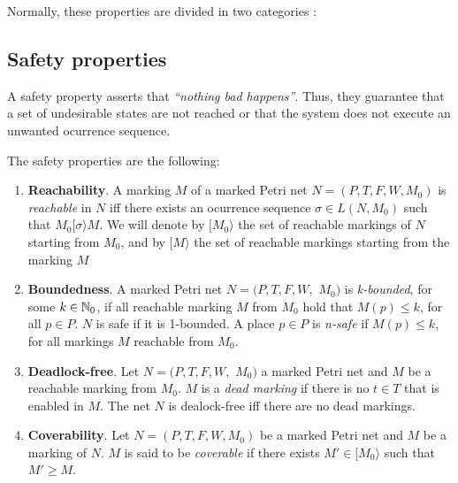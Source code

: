 \medskip
Normally, these properties are divided in two categories \cite{citar}:

\subsection{Safety properties}
A safety property asserts that \emph{``nothing bad happens''}.
Thus, they guarantee that a set of undesirable states are not reached or that
the system does not execute an unwanted ocurrence sequence.

The safety properties are the following:

\begin{enumerate}
\item {\bf Reachability}. A marking $M$ of a marked Petri net
$N= (P,T,F,W,M_0)$ is {\it reachable} in $N$
iff there exists an ocurrence sequence $\sigma \in L(N,M_0)$
such that $M_0 [ \sigma \rangle M$. We will denote by $[M_0\rangle$ the
set of reachable markings of $N$ starting from $M_0$, and
by $[ M \rangle$ the set of reachable markings starting from the marking $M$

\item {\bf Boundedness}. A marked Petri net $N=(P,T,F,W,$ \linebreak
$M_0)$ is {\it k-bounded}, for some $k \in \mathbb{N}_{0}$, if all reachable marking
$M$ from $M_0$ hold that $M(p) \leq k$, for all $p \in P$. $N$ is safe if
it is 1-bounded. A place $p \in P$ is
{\it n-safe} if $M(p) \leq k$, for all markings $M$ reachable from $M_0$.

\item {\bf Deadlock-free}. Let $N=(P,T,F,W,$ \linebreak
$M_0)$ a marked Petri net and $M$ be a reachable marking from $M_0$.
$M$ is a {\it dead marking} if there is no $t \in T$ that is enabled in $M$. 
The net $N$ is dealock-free iff there are no dead markings.

\item {\bf Coverability}.
Let $N=(P,T,F,W,M_0)$ be a marked Petri net and $M$ be a marking of $N$.
$M$ is said to be {\it coverable} if there exists $M' \in
[M_0 \rangle$ such that $M' \geq M$.
\end{enumerate}

